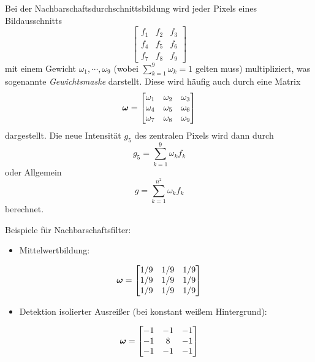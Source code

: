 					Bei der Nachbarschaftsdurchschnittsbildung wird jeder Pixels eines Bildausschnitts
					\begin{equation*}
						\begin{bmatrix}
							f_1 & f_2 & f_3 \\
							f_4 & f_5 & f_6 \\
							f_7 & f_8 & f_9
						\end{bmatrix}
					\end{equation*}
					mit einem Gewicht \( \omega_1, \cdots, \omega_9 \) (wobei \( \sum_{k = 1}^{9} \omega_k = 1 \) gelten muss) multipliziert, was sogenannte \emph{Gewichtsmaske} darstellt. Diese wird häufig auch durch eine Matrix
					\begin{equation*}
						\boldsymbol{\mathrm{\omega}} =
							\begin{bmatrix}
								\omega_1 & \omega_2 & \omega_3 \\
								\omega_4 & \omega_5 & \omega_6 \\
								\omega_7 & \omega_8 & \omega_9
							\end{bmatrix}
					\end{equation*}
					dargestellt. Die neue Intensität \( g_5 \) des zentralen Pixels wird dann durch
					\begin{equation*}
						g_5 = \sum_{k = 1}^{9} \omega_k f_k
					\end{equation*}
					oder Allgemein
					\begin{equation*}
						g = \sum_{k = 1}^{n^2} \omega_k f_k
					\end{equation*}
					berechnet.
					
					Beispiele für Nachbarschaftsfilter:
					\begin{itemize}
						\item Mittelwertbildung:
					\end{itemize}
					\begin{equation*}
						\boldsymbol{\mathrm{\omega}} =
							\begin{bmatrix}
								1/9 & 1/9 & 1/9 \\
								1/9 & 1/9 & 1/9 \\
								1/9 & 1/9 & 1/9
							\end{bmatrix}
					\end{equation*}
					\begin{itemize}
						\item Detektion isolierter Ausreißer (\zB bei konstant weißem Hintergrund):
					\end{itemize}
					\begin{equation*}
						\boldsymbol{\mathrm{\omega}} =
							\begin{bmatrix}
								-1 & -1 & -1 \\
								-1 &  8 & -1 \\
								-1 & -1 & -1
							\end{bmatrix}
					\end{equation*}
					
